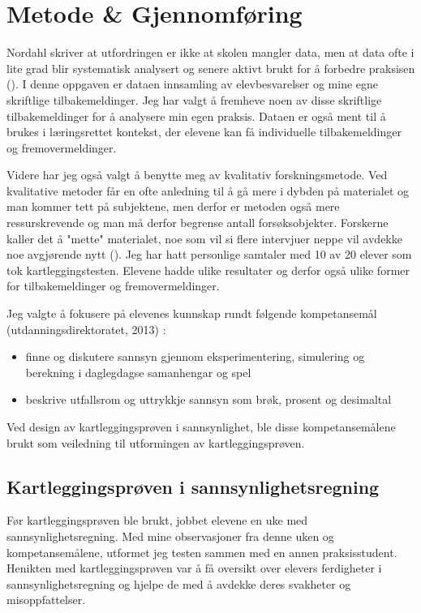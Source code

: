 \documentclass[main.tex]{subfiles}
\begin{document}
\section*{Metode \& Gjennomføring}
\label{sec:2}

Nordahl skriver at utfordringen er ikke at skolen mangler data, men at data ofte i lite grad blir
systematisk analysert og senere aktivt brukt for å forbedre praksisen ().
I denne oppgaven er dataen innsamling av elevbesvarelser og mine egne skriftlige tilbakemeldinger.
Jeg har valgt å fremheve noen av disse skriftlige tilbakemeldinger for å analysere min egen praksis.
Dataen er også ment til å brukes i læringsrettet kontekst, der elevene kan få individuelle 
tilbakemeldinger og fremovermeldinger. 

Videre har jeg også valgt å benytte meg av kvalitativ forskningsmetode. Ved kvalitative metoder 
får en ofte anledning til å gå mere i dybden på materialet og man kommer tett på subjektene, men derfor er metoden også 
mere ressurskrevende og man må derfor begrense antall forsøksobjekter. Forskerne kaller det å "mette" materialet, noe som 
vil si flere intervjuer neppe vil avdekke noe avgjørende nytt (). Jeg har hatt personlige samtaler med 10 
av 20 elever som tok kartleggingstesten. Elevene hadde ulike resultater og derfor også ulike former for tilbakemeldinger 
og fremovermeldinger.

Jeg valgte å fokusere på elevenes kunnskap rundt følgende kompetansemål (utdanningsdirektoratet, 2013) :
\begin{itemize}
\item finne og diskutere sannsyn gjennom eksperimentering, simulering og berekning i daglegdagse samanhengar og spel
\item beskrive utfallsrom og uttrykkje sannsyn som brøk, prosent og desimaltal
\end{itemize}
Ved design av kartleggingsprøven i sannsynlighet, ble disse kompetansemålene brukt som veiledning til utformingen av 
kartleggingsprøven.

\subsection*{Kartleggingsprøven i sannsynlighetsregning}

Før kartleggingsprøven ble brukt, jobbet elevene en uke med sannsynlighetsregning. Med mine observasjoner fra denne uken 
og kompetansemålene, utformet jeg testen sammen med en annen praksisstudent. Henikten med kartleggingsprøven 
var å få oversikt over elevers ferdigheter i sannsynlighetsregning og hjelpe de med å avdekke deres
svakheter og misoppfattelser. 
\newline
\end{document}
